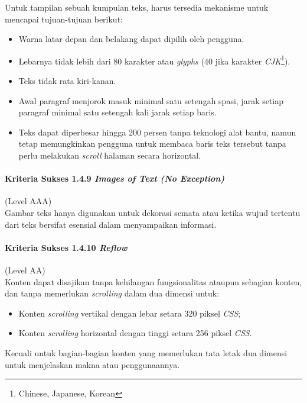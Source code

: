 Untuk tampilan sebuah kumpulan teks, harus tersedia mekanisme untuk mencapai tujuan-tujuan berikut:

\begin{itemize}
	\item Warna latar depan dan belakang dapat dipilih oleh pengguna.
	\item Lebarnya tidak lebih dari 80 karakter atau \textit{glyphs} (40 jika karakter \textit{CJK}\footnote{Chinese, Japanese, Korean}).
	\item Teks tidak rata kiri-kanan.
	\item Awal paragraf menjorok masuk minimal satu setengah spasi, jarak setiap paragraf minimal satu setengah kali jarak setiap baris.
	\item Teks dapat diperbesar hingga 200 persen tanpa teknologi alat bantu, namun tetap memungkinkan pengguna untuk membaca baris teks tersebut tanpa perlu melakukan \textit{scroll} halaman secara horizontal.
\end{itemize}

\paragraph{Kriteria Sukses 1.4.9 \textit{Images of Text (No Exception)}}
\label{sec:kriteria_sukses_1.4.9}
(Level AAA)\\

Gambar teks hanya digunakan untuk dekorasi semata atau ketika wujud tertentu dari teks bersifat esensial dalam menyampaikan informasi.

\paragraph{Kriteria Sukses 1.4.10 \textit{Reflow}}
\label{sec:kriteria_sukses_1.4.10}
(Level AA)\\

Konten dapat disajikan tanpa kehilangan fungsionalitas ataupun sebagian konten, dan tanpa memerlukan \textit{scrolling} dalam dua dimensi untuk:

\begin{itemize}
	\item Konten \textit{scrolling} vertikal dengan lebar setara 320 piksel \textit{CSS};
	\item Konten \textit{scrolling} horizontal dengan tinggi setara 256 piksel \textit{CSS}.
\end{itemize}

Kecuali untuk bagian-bagian konten yang memerlukan tata letak dua dimensi untuk menjelaskan makna atau penggunaannya.

